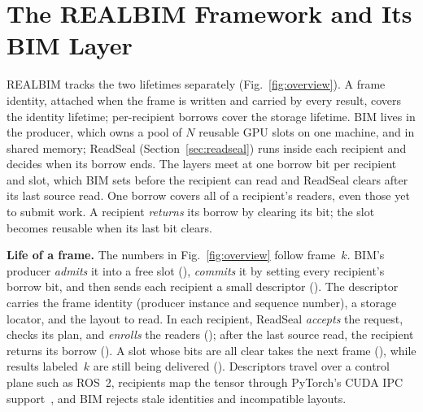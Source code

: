 \documentclass[conference]{IEEEtran}
\newcommand{\sys}{REALBIM}
\newcommand{\circled}[1]{\ding{\numexpr201+#1\relax}}   %
\begin{document}
\section{The \sys{} Framework and Its BIM Layer}
\label{sec:bim}

\sys{} tracks the two lifetimes separately (Fig.~\ref{fig:overview}). A frame identity, attached when the frame is written and carried by every result, covers the identity lifetime; per-recipient borrows cover the storage lifetime. BIM lives in the producer, which owns a pool of $N$ reusable GPU slots on one machine, and in shared memory; ReadSeal (Section~\ref{sec:readseal}) runs inside each recipient and decides when its borrow ends. The layers meet at one borrow bit per recipient and slot, which BIM sets before the recipient can read and ReadSeal clears after its last source read. One borrow covers all of a recipient's readers, even those yet to submit work. A recipient \emph{returns} its borrow by clearing its bit; the slot becomes reusable when its last bit clears.

\textbf{Life of a frame.} The numbers in Fig.~\ref{fig:overview} follow frame~$k$. BIM's producer \emph{admits} it into a free slot (\circled{1}), \emph{commits} it by setting every recipient's borrow bit, and then sends each recipient a small descriptor (\circled{2}). The descriptor carries the frame identity (producer instance and sequence number), a storage locator, and the layout to read. In each recipient, ReadSeal \emph{accepts} the request, checks its plan, and \emph{enrolls} the readers (\circled{3}); after the last source read, the recipient returns its borrow (\circled{4}). A slot whose bits are all clear takes the next frame (\circled{5}), while results labeled~$k$ are still being delivered (\circled{6}). Descriptors travel over a control plane such as ROS~2, recipients map the tensor through PyTorch's CUDA IPC support~\cite{pytorch}, and BIM rejects stale identities and incompatible layouts.
\end{document}
